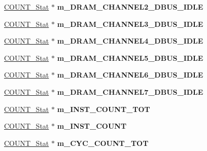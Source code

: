 \begin{DoxyCompactItemize}
\item 
\hypertarget{classall__stats__c_a8c8434dd55b0e36cb50d68cd2686ad3d}{
\hyperlink{classCOUNT__Stat}{COUNT\_\-Stat} $\ast$ {\bfseries m\_\-DRAM\_\-CHANNEL2\_\-DBUS\_\-IDLE}}
\label{classall__stats__c_a8c8434dd55b0e36cb50d68cd2686ad3d}

\item 
\hypertarget{classall__stats__c_ab01c714f986a96b67d6550e9d04738f9}{
\hyperlink{classCOUNT__Stat}{COUNT\_\-Stat} $\ast$ {\bfseries m\_\-DRAM\_\-CHANNEL3\_\-DBUS\_\-IDLE}}
\label{classall__stats__c_ab01c714f986a96b67d6550e9d04738f9}

\item 
\hypertarget{classall__stats__c_accb56f51fe71faa7eff5e2361be735ab}{
\hyperlink{classCOUNT__Stat}{COUNT\_\-Stat} $\ast$ {\bfseries m\_\-DRAM\_\-CHANNEL4\_\-DBUS\_\-IDLE}}
\label{classall__stats__c_accb56f51fe71faa7eff5e2361be735ab}

\item 
\hypertarget{classall__stats__c_a0d7912d056026f327d19d9b767e46c33}{
\hyperlink{classCOUNT__Stat}{COUNT\_\-Stat} $\ast$ {\bfseries m\_\-DRAM\_\-CHANNEL5\_\-DBUS\_\-IDLE}}
\label{classall__stats__c_a0d7912d056026f327d19d9b767e46c33}

\item 
\hypertarget{classall__stats__c_a2dbfc4b6e02bb07af4956e62673aede8}{
\hyperlink{classCOUNT__Stat}{COUNT\_\-Stat} $\ast$ {\bfseries m\_\-DRAM\_\-CHANNEL6\_\-DBUS\_\-IDLE}}
\label{classall__stats__c_a2dbfc4b6e02bb07af4956e62673aede8}

\item 
\hypertarget{classall__stats__c_a80479beda616a2f0504ca2acc163a7c2}{
\hyperlink{classCOUNT__Stat}{COUNT\_\-Stat} $\ast$ {\bfseries m\_\-DRAM\_\-CHANNEL7\_\-DBUS\_\-IDLE}}
\label{classall__stats__c_a80479beda616a2f0504ca2acc163a7c2}

\item 
\hypertarget{classall__stats__c_a263680816454d0bc0c019dd20ba927ed}{
\hyperlink{classCOUNT__Stat}{COUNT\_\-Stat} $\ast$ {\bfseries m\_\-INST\_\-COUNT\_\-TOT}}
\label{classall__stats__c_a263680816454d0bc0c019dd20ba927ed}

\item 
\hypertarget{classall__stats__c_a16bd5eb94ae730f3b480ad5d0b072301}{
\hyperlink{classCOUNT__Stat}{COUNT\_\-Stat} $\ast$ {\bfseries m\_\-INST\_\-COUNT}}
\label{classall__stats__c_a16bd5eb94ae730f3b480ad5d0b072301}

\item 
\hypertarget{classall__stats__c_ac147785b24ec6d41435c838cc5810fe0}{
\hyperlink{classCOUNT__Stat}{COUNT\_\-Stat} $\ast$ {\bfseries m\_\-CYC\_\-COUNT\_\-TOT}}
\label{classall__stats__c_ac147785b24ec6d41435c838cc5810fe0}


\end{DoxyCompactItemize}
